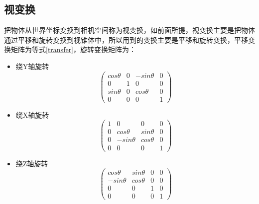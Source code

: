 	\subsection{视变换}
	\begin{spacing}{2.5}
	把物体从世界坐标变换到相机空间称为视变换，如前面所提，视变换主要是把物体通过平移和旋转变换到视锥体中，所以用到的变换主要是平移和旋转变换，平移变换矩阵为等式\ref{transfer}，旋转变换矩阵为：
	\end{spacing}
	\begin{itemize}
	\item 绕Y轴旋转
	\begin{equation}
		\begin{pmatrix}
			cos\theta &  0&  -sin\theta &0 \\ 
 			0&  1&  0& 0\\ 
 			sin\theta & 0 & cos\theta &0 \\ 
 			0&  0&  0& 1
		\end{pmatrix}
		\label{xrotate}
	\end{equation}
	\item 	绕X轴旋转
	\begin{equation}
		\begin{pmatrix}
			 1&  0&  0 &0 \\ 
 			0&  cos\theta &  sin\theta& 0\\ 
 			 0& -sin\theta & cos\theta &0 \\ 
 			0&  0&  0& 1
		\end{pmatrix}
		\label{yrotate}
		\end{equation}
	\item 绕Z轴旋转
	\begin{equation}
		\begin{pmatrix}
			cos\theta &  sin\theta &  0 &0 \\ 
 			-sin\theta &  cos\theta &  0& 0\\ 
 			0 & 0 & 1 &0 \\ 
 			0&  0&  0& 1
		\end{pmatrix}
		\label{zrotate}
	\end{equation}
	\end{itemize}
	
	
